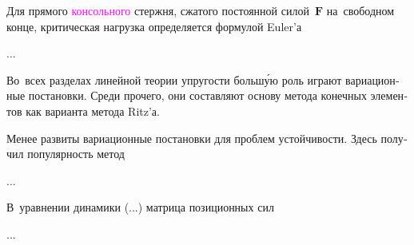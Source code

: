 \begin{otherlanguage}{russian}

Для прямого \textcolor{magenta}{консольного} стержня, сжатого постоянной силой~$\bm{F}$ на~свободном конце, критическая нагрузка определяется формулой Euler’а

...



\end{otherlanguage}



\begin{otherlanguage}{russian}

Во~всех разделах линейной теории упругости больш\'{у}ю роль играют вариационные постановки. Среди прочего, они составляют основу метода конечных элементов как варианта метода Ritz’а.

Менее развиты вариационные постановки для проблем устойчивости. Здесь получил популярность метод

...



\end{otherlanguage}



\begin{otherlanguage}{russian}

В~уравнении динамики (...) матрица позиционных сил

...



\end{otherlanguage}


